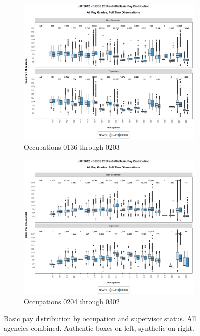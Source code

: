 \documentclass[10pt, letterpaper]{article}
\begin{document}
\begin{spacing}{1.0}
\begin{figure}[h]
    \centering
    \begin{subfigure}{1\textwidth}
        \centering
        \includegraphics[width=6in, trim={0 1in 0 0.75in}, clip]{JdFDIBBSBasicPaySupervisoryStatusOccupation41.png}
        \caption{Occupations 0136 through 0203}
        \vspace{10pt}
    \end{subfigure}
    \begin{subfigure}{1\textwidth}
        \centering
        \includegraphics[width=6in, trim={0 1in 0 0.75in}, clip]{JdFDIBBSBasicPaySupervisoryStatusOccupation61.png}
        \caption{Occupations 0204 through 0302}
        \vspace{10pt}
    \end{subfigure}
    \caption{Basic pay distribution by occupation and supervisor status.  All agencies combined.  Authentic boxes on left, synthetic on right.}
    \label{figure:JdFDIBBSBasicPaySupervisoryStatusOccupation2}
\end{figure}


\end{spacing}
\end{document}
